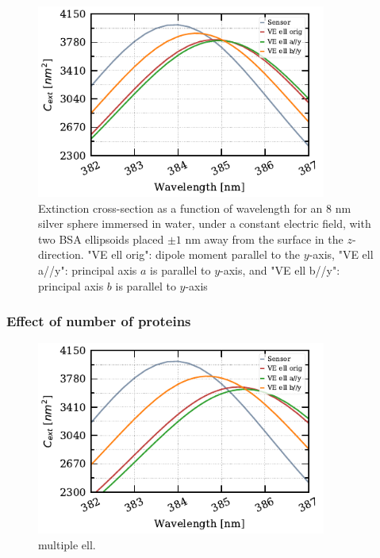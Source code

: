  
 \begin{figure} %
     \centering
     \includegraphics[width=0.85\textwidth]{two_ve_ell_mult_config.pdf} 
     \caption{Extinction cross-section as a function of wavelength for an $8$ nm
     silver sphere immersed in water, under a constant electric field, with two BSA ellipsoids placed 
     $\pm 1$ nm away from the surface in the $z$-direction. "VE ell orig": dipole moment parallel to the $y$-axis,
     "VE ell a//y": principal axis $a$ is parallel to $y$-axis, and "VE ell b//y": principal axis $b$ is parallel to $y$-axis}
     \label{fig:two_ell_mult_config}
  \end{figure}
 


\subsubsection{Effect of number of proteins}

\begin{figure} %
    \centering
    \includegraphics[width=0.85\textwidth]{six_ve_ell_mult_config.pdf} 
    \caption{multiple ell.}
    \label{fig:}
 \end{figure}

